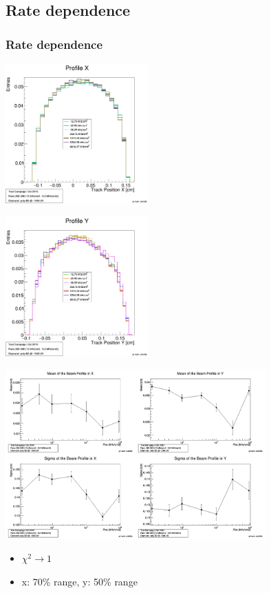 \documentclass[9pt]{beamer}
\begin{document}
\subsection{Rate dependence}
\begin{frame}
	\frametitle{Rate dependence}
	\begin{center}
		\begin{minipage}{5.5cm}
			\centering
			\includegraphics[width=5.5cm]{AllBeamProfilesX}
		\end{minipage}
		\hspace*{2pt}
		\begin{minipage}{5.5cm}
			\centering
			\includegraphics[width=5.5cm]{AllBeamProfilesY}
		\end{minipage}\no\s
	\end{center}
\end{frame}
\begin{frame}
	\begin{center}
		\includegraphics[width=10cm]{BeamProfileOverview}
	\end{center}
	\begin{itemize}
		\item $\chi^{2}\rightarrow1$
		\item x: 70\% range, y: 50\% range
	\end{itemize}
\end{frame}
\end{document}
